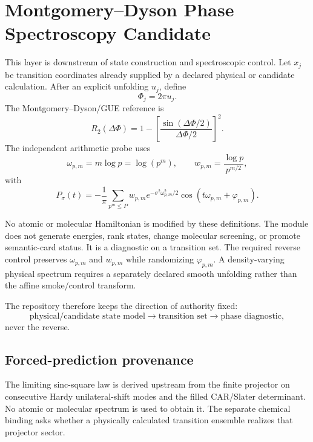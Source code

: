 \chapter{Montgomery--Dyson Phase Spectroscopy Candidate}
\label{ch:phase-spectroscopy-candidate}

This layer is downstream of state construction and spectroscopic control.  Let \(x_j\) be transition coordinates already supplied by a declared physical or candidate calculation.  After an explicit unfolding \(u_j\), define
\[
\Phi_j=2\pi u_j.
\]
The Montgomery--Dyson/GUE reference is
\[
R_2(\Delta\Phi)
=
1-
\left[
\frac{\sin(\Delta\Phi/2)}{\Delta\Phi/2}
\right]^2.
\]
The independent arithmetic probe uses
\[
\omega_{p,m}=m\log p=\log(p^m),
\qquad
w_{p,m}=\frac{\log p}{p^{m/2}},
\]
with
\[
P_\sigma(t)
=
-\frac{1}{\pi}
\sum_{p^m\le P}
w_{p,m}
e^{-\sigma^2\omega_{p,m}^2/2}
\cos(t\omega_{p,m}+\varphi_{p,m}).
\]

No atomic or molecular Hamiltonian is modified by these definitions.  The module does not generate energies, rank states, change molecular screening, or promote semantic-card status.  It is a diagnostic on a transition set.  The required reverse control preserves \(\omega_{p,m}\) and \(w_{p,m}\) while randomizing \(\varphi_{p,m}\).  A density-varying physical spectrum requires a separately declared smooth unfolding rather than the affine smoke/control transform.

The repository therefore keeps the direction of authority fixed:
\[
\text{physical/candidate state model}
\rightarrow
\text{transition set}
\rightarrow
\text{phase diagnostic},
\]
never the reverse.


\section*{Forced-prediction provenance}
The limiting sinc-square law is derived upstream from the finite projector on consecutive Hardy unilateral-shift modes and the filled CAR/Slater determinant. No atomic or molecular spectrum is used to obtain it. The separate chemical binding asks whether a physically calculated transition ensemble realizes that projector sector.
